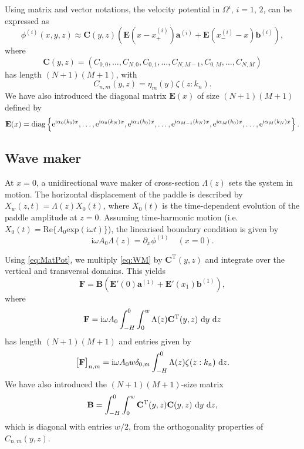 \documentclass[12pt,a4paper]{article}
\newcommand{\real}{\textrm{Re}}
\newcommand{\wrt}{ ~ {\rm d}}
\def\ci{{\mathrm i}}
\renewcommand{\exp}{{\rm e}}
\newcommand{\ie}{i.e.\ }
\newcommand{\vp}{{\phi}}
\newcommand{\vm}{{\zeta}}
\newcommand{\ym}{{\eta}}
\newcommand{\kx}{\alpha}
\begin{document}
Using matrix and vector notations, the velocity potential in $\Omega^{i}$, $i=1,\,2$, can be expressed as
\begin{equation}
  \label{eq:MatPot}
 \vp^{(i)}(x,y,z) \approx \mathbf{C}(y,z)\left(\mathbf{E}(x-x^{(i)}_+)\mathbf{a}^{(i)} + 
 \mathbf{E}(x^{(i)}_--x)\mathbf{b}^{(i)}\right),
\end{equation}
where
\[
  \mathbf{C}(y,z) = \left(C_{0,0},\ldots,C_{N,0},C_{0,1},\ldots,C_{N,M-1},C_{0,M},\ldots,C_{N,M}\right)
\]
has length $(N+1)(M+1)$, with 
\[
  C_{n,m}(y,z) = \ym_{m}(y) \vm(z:k_{n}).
\]
We have also introduced the diagonal matrix $\mathbf{E}(x)$ of size $(N+1)(M+1)$ defined by
\[
  \mathbf{E}(x) = \mathrm{diag}\left\{\exp^{\ci\kx_{0}(k_{0})x},\ldots,\exp^{\ci\kx_{0}(k_{N})x},
  \exp^{\ci\kx_{1}(k_{0})x},\ldots,\exp^{\ci\kx_{M-1}(k_{N})x},\exp^{\ci\kx_{M}(k_{0})x},\ldots,
  \exp^{\ci\kx_{M}(k_{N})x}\right\}.
\]


\subsection{Wave maker}

At $x=0$, a unidirectional wave maker of cross-section $\Lambda(z)$ sets the system in motion. The 
horizontal displacement of the paddle is described by $X_w(z,t)=\Lambda(z)X_0(t)$, where $X_0(t)$ is the 
time-dependent evolution of the paddle amplitude at $z = 0$. Assuming time-harmonic motion (\ie 
$X_0(t) = \real\{A_0\mathrm{exp}(\ci\omega t)\}$), the linearised 
boundary condition is given by
\begin{equation}
  \label{eq:WM}
  \ci \omega A_0 \Lambda(z) = \partial_x \vp^{(1)} \quad (x=0).
\end{equation}

Using \eqref{eq:MatPot}, we multiply \eqref{eq:WM} by $\mathbf{C}^{\mathrm{T}}(y,z)$ and integrate over the 
vertical and transversal domains. This yields
\begin{equation}
  \label{eq:WM_proj}
  \mathbf{F} = \mathbf{B}\left(\mathbf{E}'(0)\mathbf{a}^{(1)} + \mathbf{E}'(x_1)\mathbf{b}^{(1)}\right),
\end{equation}
where
\[
  \mathbf{F} = \ci \omega A_0 \int_{-H}^0 \int_0^w \Lambda(z) \mathbf{C}^{\mathrm{T}}(y,z) \wrt y \wrt z
\]
has length $(N+1)(M+1)$ and entries given by 
\[
  \big[\mathbf{F}\big]_{n,m} = \ci \omega A_0 w \delta_{0,m} \int_{-H}^0 \Lambda(z) \vm(z:k_{n}) \wrt z.
\]
We have also introduced the $(N+1)(M+1)$-size matrix
\[
  \mathbf{B} = \int_{-H}^0 \int_0^w \mathbf{C}^{\mathrm{T}}(y,z) \mathbf{C}(y,z) \wrt y \wrt z,
\]
which is diagonal with entries $w/2$, from the orthogonality properties of $C_{n,m}(y,z)$.
\end{document}
